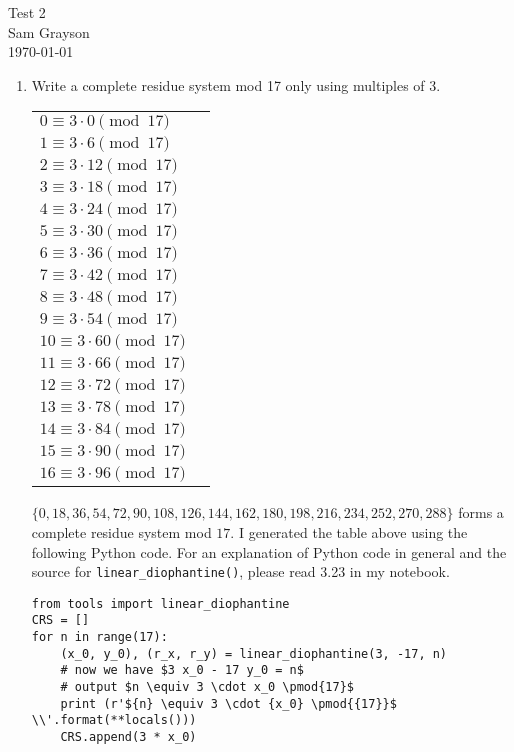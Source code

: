 \documentclass[12pt,letterpaper]{article}
\begin{document}
\doublespacing
\begin{center}
{\Large Test 2} \\[14pt]
{\large Sam Grayson} \\[0pt]
{\today} \\
\end{center}

\singlespacing
\setlength{\parindent}{0pt}

\begin{enumerate}[leftmargin=0mm]
\item Write a complete residue system mod 17 only using multiples of 3.

\begin{tabular}[t]{l l}
$0 \equiv 3 \cdot 0 \pmod{17}$ \\
$1 \equiv 3 \cdot 6 \pmod{17}$ \\
$2 \equiv 3 \cdot 12 \pmod{17}$ \\
$3 \equiv 3 \cdot 18 \pmod{17}$ \\
$4 \equiv 3 \cdot 24 \pmod{17}$ \\
$5 \equiv 3 \cdot 30 \pmod{17}$ \\
$6 \equiv 3 \cdot 36 \pmod{17}$ \\
$7 \equiv 3 \cdot 42 \pmod{17}$ \\
$8 \equiv 3 \cdot 48 \pmod{17}$ \\
$9 \equiv 3 \cdot 54 \pmod{17}$ \\
$10 \equiv 3 \cdot 60 \pmod{17}$ \\
$11 \equiv 3 \cdot 66 \pmod{17}$ \\
$12 \equiv 3 \cdot 72 \pmod{17}$ \\
$13 \equiv 3 \cdot 78 \pmod{17}$ \\
$14 \equiv 3 \cdot 84 \pmod{17}$ \\
$15 \equiv 3 \cdot 90 \pmod{17}$ \\
$16 \equiv 3 \cdot 96 \pmod{17}$ \\
\end{tabular}

\(\{0, 18, 36, 54, 72, 90, 108, 126, 144, 162, 180, 198, 216, 234, 252, 270, 288\}\) forms a complete residue system mod \(17\). I generated the table above using the following Python code. For an explanation of Python code in general and the source for \texttt{linear_diophantine()}, please read 3.23 in my notebook.

\begin{verbatim}
from tools import linear_diophantine
CRS = []
for n in range(17):
    (x_0, y_0), (r_x, r_y) = linear_diophantine(3, -17, n)
    # now we have $3 x_0 - 17 y_0 = n$
    # output $n \equiv 3 \cdot x_0 \pmod{17}$
    print (r'${n} \equiv 3 \cdot {x_0} \pmod{{17}}$ \\'.format(**locals()))
    CRS.append(3 * x_0)


\end{verbatim}
\end{enumerate}
\end{document}
